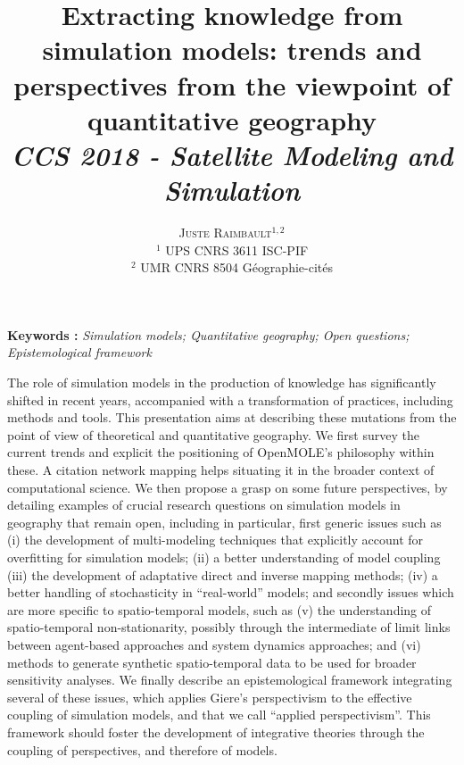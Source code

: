 \documentclass[11pt]{article}
\newcommand{\noun}[1]{\textsc{#1}}
\begin{document}
\title{Extracting knowledge from simulation models: trends and perspectives from the viewpoint of quantitative geography
\\\medskip
\textit{CCS 2018 - Satellite Modeling and Simulation}
}
\author{\noun{Juste Raimbault}$^{1,2}$
\\
$^1$ UPS CNRS 3611 ISC-PIF\\
$^2$ UMR CNRS 8504 G{\'e}ographie-cit{\'e}s
}
\date{}

\maketitle

\justify



\textbf{Keywords : }\textit{Simulation models; Quantitative geography; Open questions; Epistemological framework}

\medskip

The role of simulation models in the production of knowledge has significantly shifted in recent years, accompanied with a transformation of practices, including methods and tools. This presentation aims at describing these mutations from the point of view of theoretical and quantitative geography. We first survey the current trends and explicit the positioning of OpenMOLE's philosophy within these. A citation network mapping helps situating it in the broader context of computational science. We then propose a grasp on some future perspectives, by detailing examples of crucial research questions on simulation models in geography that remain open, including in particular, first generic issues such as (i) the development of multi-modeling techniques that explicitly account for overfitting for simulation models; (ii) a better understanding of model coupling (iii) the development of adaptative direct and inverse mapping methods; (iv) a better handling of stochasticity in ``real-world'' models; and secondly issues which are more specific to spatio-temporal models, such as (v) the understanding of spatio-temporal non-stationarity, possibly through the intermediate of limit links between agent-based approaches and system dynamics approaches; and (vi) methods to generate synthetic spatio-temporal data to be used for broader sensitivity analyses. We finally describe an epistemological framework integrating several of these issues, which applies Giere's perspectivism to the effective coupling of simulation models, and that we call ``applied perspectivism''. This framework should foster the development of integrative theories through the coupling of perspectives, and therefore of models.
\end{document}

